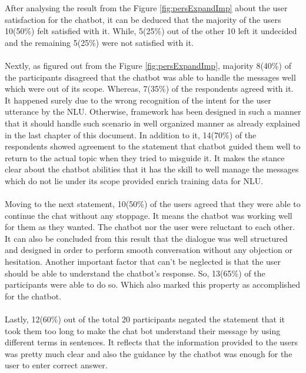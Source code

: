After analysing the result from the Figure \ref{fig:persExpandImp} about the user satisfaction for the chatbot, it can be deduced that the majority of the users 10(50\%) felt satisfied with it. While, 5(25\%) out of the other 10 left it undecided and the remaining 5(25\%) were not satisfied with it.
\\~\\
Nextly, as figured out from the Figure \ref{fig:persExpandImp}, majority 8(40\%) of the participants disagreed that the chatbot was able to handle the messages well which were out of its scope. Whereas, 7(35\%) of the respondents agreed with it. It happened surely due to the wrong recognition of the intent for the user utterance by the NLU. Otherwise, framework has been designed in such a manner that it should handle such scenario in well organized manner as already explained in the last chapter of this document. In addition to it, 14(70\%) of the respondents showed agreement to the statement that chatbot guided them well to return to the actual topic when they tried to misguide it. It makes the stance clear about the chatbot abilities that it has the skill to well manage the messages which do not lie under its scope provided enrich training data for NLU.
\\~\\
Moving to the next statement, 10(50\%) of the users agreed that they were able to continue the chat without any stoppage. It means the chatbot was working well for them as they wanted. The chatbot nor the user were reluctant to each other. It can also be concluded from this result that the dialogue was well structured and designed in order to perform smooth conversation without any objection or hesitation. Another important factor that can't be neglected is that the user should be able to understand the chatbot's response. So, 13(65\%) of the participants were able to do so. Which also marked this property as accomplished for the chatbot.
\\~\\
Lastly, 12(60\%) out of the total 20 participants negated the statement that it took them too long to make the chat bot understand their message by using different terms in sentences. It reflects that the information provided to the users was pretty much clear and also the guidance by the chatbot was enough for the user to enter correct answer.

